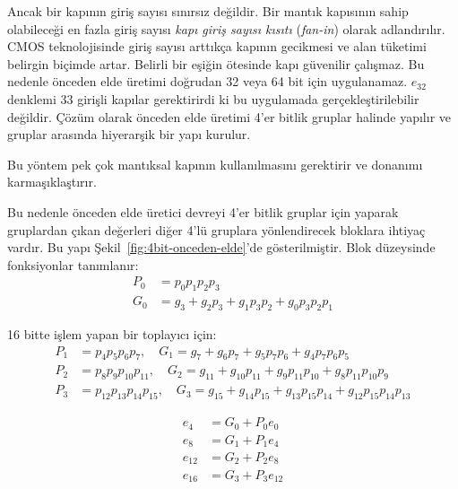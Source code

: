 Ancak bir kapının giriş sayısı sınırsız değildir. Bir mantık kapısının sahip olabileceği en fazla giriş sayısı \emph{kapı giriş sayısı kısıtı} (\emph{fan-in}) olarak adlandırılır. CMOS teknolojisinde giriş sayısı arttıkça kapının gecikmesi ve alan tüketimi belirgin biçimde artar. Belirli bir eşiğin ötesinde kapı güvenilir çalışmaz. Bu nedenle önceden elde üretimi doğrudan 32 veya 64 bit için uygulanamaz. $e_{32}$ denklemi 33 girişli kapılar gerektirirdi ki bu uygulamada gerçekleştirilebilir değildir. Çözüm olarak önceden elde üretimi 4'er bitlik gruplar halinde yapılır ve gruplar arasında hiyerarşik bir yapı kurulur.

Bu yöntem pek çok mantıksal kapının kullanılmasını gerektirir ve donanımı karmaşıklaştırır.

Bu nedenle önceden elde üretici devreyi 4'er bitlik gruplar için yaparak gruplardan çıkan değerleri diğer 4'lü gruplara yönlendirecek bloklara ihtiyaç vardır. Bu yapı Şekil~\ref{fig:4bit-onceden-elde}'de gösterilmiştir. Blok düzeysinde fonksiyonlar tanımlanır:
\begin{align}
P_0 &= p_0 p_1 p_2 p_3 \\
G_0 &= g_3 + g_2 p_3 + g_1 p_3 p_2 + g_0 p_3 p_2 p_1
\end{align}

16 bitte işlem yapan bir toplayıcı için:
\begin{align}
P_1 &= p_4 p_5 p_6 p_7, \quad G_1 = g_7 + g_6 p_7 + g_5 p_7 p_6 + g_4 p_7 p_6 p_5 \\
P_2 &= p_8 p_9 p_{10} p_{11}, \quad G_2 = g_{11} + g_{10} p_{11} + g_9 p_{11} p_{10} + g_8 p_{11} p_{10} p_9 \\
P_3 &= p_{12} p_{13} p_{14} p_{15}, \quad G_3 = g_{15} + g_{14} p_{15} + g_{13} p_{15} p_{14} + g_{12} p_{15} p_{14} p_{13}
\end{align}

\begin{align}
e_4 &= G_0 + P_0 e_0 \\
e_8 &= G_1 + P_1 e_4 \\
e_{12} &= G_2 + P_2 e_8 \\
e_{16} &= G_3 + P_3 e_{12}
\end{align}

